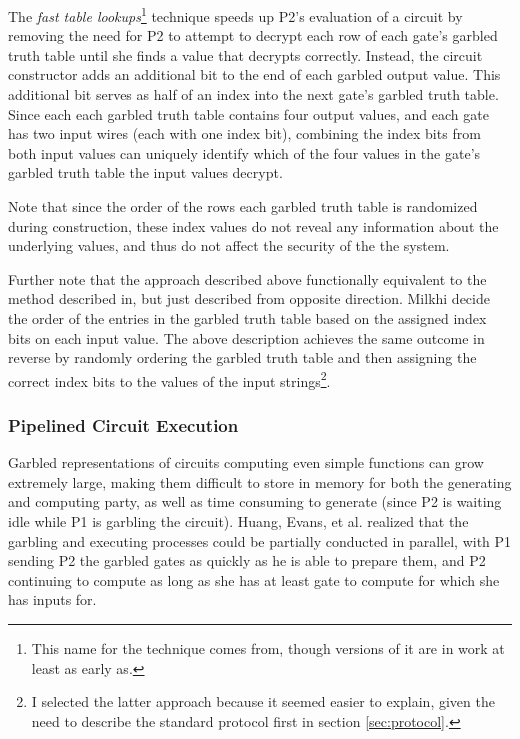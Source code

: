The \emph{fast table lookups}\footnote{This name for the technique comes from\cite{huang2011faster}, though versions of it are in work at least as early as\cite{malkhi2004fairplay}.} technique speeds up \ac{P2}'s evaluation of a circuit by removing the need for \ac{P2} to attempt to decrypt each row of each gate's garbled truth table until she finds a value that decrypts correctly.  Instead, the circuit constructor adds an additional bit to the end of each garbled output value. This additional bit serves as half of an index into the next gate's garbled truth table. Since each each garbled truth table contains four output values, and each gate has two input wires (each with one index bit), combining the index bits from both input values can uniquely identify which of the four values in the gate's garbled truth table the input values decrypt.

Note that since the order of the rows each garbled truth table is randomized during construction, these index values do not reveal any information about the underlying values, and thus do not affect the security of the the system.

Further note that the approach described above functionally equivalent to the method described in\cite{malkhi2004fairplay}, but just described from opposite direction.  Milkhi decide the order of the entries in the garbled truth table based on the assigned index bits on each input value.  The above description achieves the same outcome in reverse by randomly ordering the garbled truth table and then assigning the correct index bits to the values of the input strings\footnote{I selected the latter approach because it seemed easier to explain, given the need to describe the standard protocol first in section \ref{sec:protocol}.}.

\subsubsection{Pipelined Circuit Execution}
\label{sec:piplinedexecution}

Garbled representations of circuits computing even simple functions can grow extremely large, making them difficult to store in memory for both the generating and computing party, as well as time consuming to generate (since \ac{P2} is waiting idle while \ac{P1} is garbling the circuit).  Huang, Evans, et al.\cite{huang2011faster} realized that the garbling and executing processes could be partially conducted in parallel, with \ac{P1} sending \ac{P2} the garbled gates as quickly as he is able to prepare them, and \ac{P2} continuing to compute as long as she has at least gate to compute for which she has inputs for.

